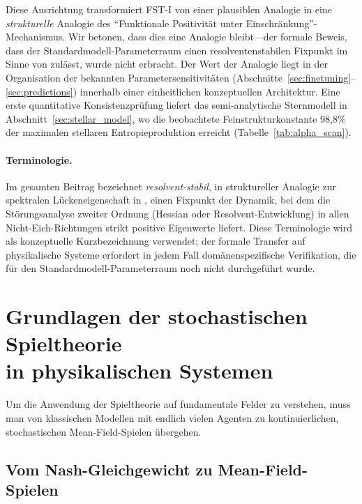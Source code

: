 \documentclass[12pt,a4paper]{article}
\theoremstyle{remark}
\begin{document}
Diese Ausrichtung transformiert FST-I von einer plausiblen Analogie in eine \emph{strukturelle} Analogie des ``Funktionale Positivit\"at unter Einschr\"ankung''-Mechanismus. Wir betonen, dass dies eine Analogie bleibt---der formale Beweis, dass der Standardmodell-Parameterraum einen resolventenstabilen Fixpunkt im Sinne von \citep{GeigerRH2026b} zul\"asst, wurde nicht erbracht. Der Wert der Analogie liegt in der Organisation der bekannten Parametersensitivit\"aten (Abschnitte~\ref{sec:finetuning}--\ref{sec:predictions}) innerhalb einer einheitlichen konzeptuellen Architektur. Eine erste quantitative Konsistenzpr\"ufung liefert das semi-analytische Sternmodell in Abschnitt~\ref{sec:stellar_model}, wo die beobachtete Feinstrukturkonstante 98,8\% der maximalen stellaren Entropieproduktion erreicht (Tabelle~\ref{tab:alpha_scan}).

\paragraph{Terminologie.} Im gesamten Beitrag bezeichnet \emph{resolvent-stabil}, in struktureller Analogie zur spektralen L\"uckeneigenschaft in \citep{GeigerRH2026b}, einen Fixpunkt der Dynamik, bei dem die St\"orungsanalyse zweiter Ordnung (Hessian oder Resolvent-Entwicklung) in allen Nicht-Eich-Richtungen strikt positive Eigenwerte liefert. Diese Terminologie wird als konzeptuelle Kurzbezeichnung verwendet; der formale Transfer auf physikalische Systeme erfordert in jedem Fall dom\"anenspezifische Verifikation, die f\"ur den Standardmodell-Parameterraum noch nicht durchgef\"uhrt wurde.

\section[Grundlagen der stochastischen Spieltheorie in physikalischen Systemen]{Grundlagen der stochastischen Spieltheorie\\in physikalischen Systemen}
\label{sec:foundations}

Um die Anwendung der Spieltheorie auf fundamentale Felder zu verstehen, muss man von klassischen Modellen mit endlich vielen Agenten zu kontinuierlichen, stochastischen Mean-Field-Spielen \"ubergehen.

\subsection{Vom Nash-Gleichgewicht zu Mean-Field-Spielen}
\end{document}

